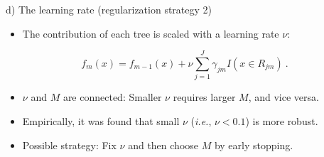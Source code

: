 \documentclass[
  10pt,
  ignorenonframetext,
]{beamer}
\providecommand{\tightlist}{%
  \setlength{\itemsep}{0pt}\setlength{\parskip}{0pt}}
\begin{document}
\begin{frame}
\begin{block}{d) The learning rate (regularization strategy 2)}
\label{d-the-learning-rate-regularization-strategy-2}
\(~\)

\begin{itemize}
\tightlist
\item
  The contribution of each tree is scaled with a learning rate \(\nu\):
\end{itemize}

\[f_m(x) = f_{m-1}(x) + \nu \sum_{j=1}^J \gamma_{jm}I(x\in R_{jm}) \ .\]

\vspace{2mm}

\begin{itemize}
\tightlist
\item
  \(\nu\) and \(M\) are connected: Smaller \(\nu\) requires larger
  \(M\), and vice versa.
\end{itemize}

\vspace{2mm}

\begin{itemize}
\tightlist
\item
  Empirically, it was found that small \(\nu\) (\emph{i.e.},
  \(\nu<0.1\)) is more robust.
\end{itemize}

\vspace{2mm}

\begin{itemize}
\tightlist
\item
  Possible strategy: Fix \(\nu\) and then choose \(M\) by early
  stopping.
\end{itemize}
\end{block}
\end{frame}
\end{document}

